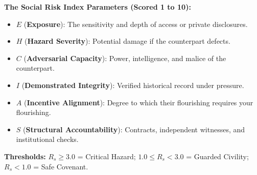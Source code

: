 \documentclass[11pt]{report}
\begin{document}
\begin{blackboard}
\textbf{The Social Risk Index Parameters (Scored 1 to 10):}
\begin{itemize}
    \item $E$ (\textbf{Exposure}): The sensitivity and depth of access or private disclosures.
    \item $H$ (\textbf{Hazard Severity}): Potential damage if the counterpart defects.
    \item $C$ (\textbf{Adversarial Capacity}): Power, intelligence, and malice of the counterpart.
    \item $I$ (\textbf{Demonstrated Integrity}): Verified historical record under pressure.
    \item $A$ (\textbf{Incentive Alignment}): Degree to which their flourishing requires your flourishing.
    \item $S$ (\textbf{Structural Accountability}): Contracts, independent witnesses, and institutional checks.
\end{itemize}
\textbf{Thresholds:} $R_s \ge 3.0$ = Critical Hazard; $1.0 \le R_s < 3.0$ = Guarded Civility; $R_s < 1.0$ = Safe Covenant.
\end{blackboard}
\end{document}
